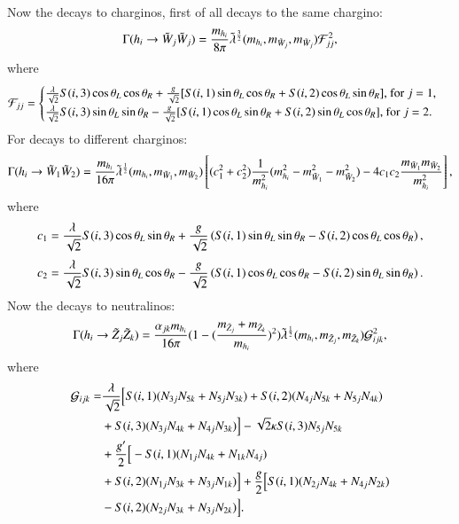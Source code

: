 \documentclass[final,3p,times]{elsarticle}
\begin{document}
Now the decays to charginos, first of all decays to the same chargino:
\begin{equation} \label{hchchNMSSM}
\Gamma( h_{i} \rightarrow \tilde{W}_j \tilde{W}_j) = {m_{h_i} \over 8\pi} \tilde{\lambda}^{3 \over 2}(m_{h_i},m_{\tilde{W}_j},m_{\tilde{W}_j})\mathcal{F}_{jj}^2,
\end{equation}
where
\begin{equation}
\mathcal{F}_{jj} = \begin{cases}
					{\lambda \over \sqrt{2}}S(i,3)\cos\theta_L \cos\theta_R + {g \over \sqrt{2}}[S(i,1)\sin\theta_L \cos\theta_R + S(i,2)\cos\theta_L \sin\theta_R] $, for $j=1$, $ \\
					{\lambda \over \sqrt{2}}S(i,3)\sin\theta_L \sin\theta_R - {g \over \sqrt{2}}[S(i,1)\cos\theta_L \sin\theta_R + S(i,2)\sin\theta_L \cos\theta_R] $, for $j=2$. $ \\
					\end{cases}
\end{equation}
For decays to different charginos:
\begin{equation} \label{hch1ch2NMSSM}
\Gamma( h_{i} \rightarrow \tilde{W}_1 \tilde{W}_2) = {m_{h_i} \over 16\pi} \tilde{\lambda}^{1 \over 2}(m_{h_i},m_{\tilde{W}_1},m_{\tilde{W}_2})\left[(c_{1}^2 + c_{2}^2){1 \over m_{h_i}^2}(m_{h_i}^2- m_{\tilde{W}_1}^2 - m_{\tilde{W}_2}^2) - 4c_{1}c_{2}{m_{\tilde{W}_1}m_{\tilde{W}_2} \over m_{h_i}^2}\right] ,
\end{equation}
where
\begin{equation}
c_{1} = {\lambda \over \sqrt{2}}S(i,3)\cos\theta_L \sin\theta_R + {g \over \sqrt{2}}\left(S(i,1)\sin\theta_L \sin\theta_R - S(i,2)\cos\theta_L \cos\theta_R\right),
\end{equation}
\begin{equation}
c_{2} = {\lambda \over \sqrt{2}}S(i,3)\sin\theta_L \cos\theta_R - {g \over \sqrt{2}}\left(S(i,1)\cos\theta_L \cos\theta_R - S(i,2)\sin\theta_L \sin\theta_R\right).
\end{equation}
Now the decays to neutralinos:
\begin{equation} \label{hneutneutNMSSM}
\Gamma(h_{i} \rightarrow \tilde{Z}_j \tilde{Z}_k) = {\alpha_{jk} m_{h_i} \over 16 \pi} (1 - ({m_{\tilde{Z}_j} + m_{\tilde{Z}_k} \over m_{h_i}})^2) \tilde{\lambda}^{1 \over 2}(m_{h_i},m_{\tilde{Z}_j},m_{\tilde{Z}_k}) \mathcal{G}_{ijk}^2,
\end{equation}
where
\begin{equation}
\begin{aligned}
\mathcal{G}_{ijk} = & {\lambda \over \sqrt{2}}\Big[S(i,1)(N_{3j}N_{5k} + N_{5j}N_{3k}) + S(i,2)(N_{4j}N_{5k} + N_{5j}N_{4k}) \\ & + S(i,3)(N_{3j}N_{4k} + N_{4j}N_{3k})\Big]  - \sqrt{2}\kappa S(i,3)N_{5j}N_{5k} \\ & + {g' \over 2}\Big[-S(i,1)(N_{1j}N_{4k} + N_{1k}N_{4j}) \\ & + S(i,2)(N_{1j}N_{3k}+N_{3j}N_{1k})\Big] + {g \over 2}\Big[S(i,1)(N_{2j}N_{4k} + N_{4j}N_{2k}) \\ & - S(i,2)(N_{2j}N_{3k}+N_{3j}N_{2k})\Big].
\end{aligned}
\end{equation}
\end{document}
